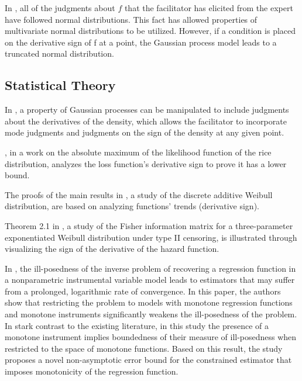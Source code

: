 \documentclass[11pt]{book}
\begin{document}
In \cite{riutort2020correlated}, all of the judgments about $f$
that the facilitator has elicited from the expert have followed normal
distributions. This fact has allowed properties of multivariate normal
distributions to be utilized. However, if a condition is placed on
the derivative sign of f at a point, the Gaussian process model leads
to a truncated normal distribution.


\subsection{Statistical Theory}

In \cite{gosling2007nonparametric}, a property of Gaussian processes
can be manipulated to include judgments about the derivatives of the
density, which allows the facilitator to incorporate mode judgments
and judgments on the sign of the density at any given point.

\cite{carobbi2008absolute}, in a work on the absolute maximum of the likelihood function of
the rice distribution, analyzes the loss function's derivative
sign to prove it has a lower bound.

The proofs of the main results in \cite{bebbington2012discrete}, a study of the discrete additive Weibull distribution,
are based on analyzing functions' trends (derivative sign).

Theorem 2.1 in \cite{qian2012fisher}, a study of the Fisher information matrix for a three-parameter exponentiated Weibull
distribution under type II censoring, is illustrated through visualizing
the sign of the derivative of the hazard function.

In \cite{chetverikov2017nonparametric}, the ill-posedness of the
inverse problem of recovering a regression function in a nonparametric
instrumental variable model leads to estimators that may suffer from
a prolonged, logarithmic rate of convergence. In this paper, the authors
show that restricting the problem to models with monotone regression
functions and monotone instruments significantly weakens the ill-posedness
of the problem. In stark contrast to the existing literature, in this study the
presence of a monotone instrument implies boundedness of their measure
of ill-posedness when restricted to the space of monotone functions.
Based on this result, the study proposes a novel non-asymptotic error bound
for the constrained estimator that imposes monotonicity of the regression
function.
\end{document}

